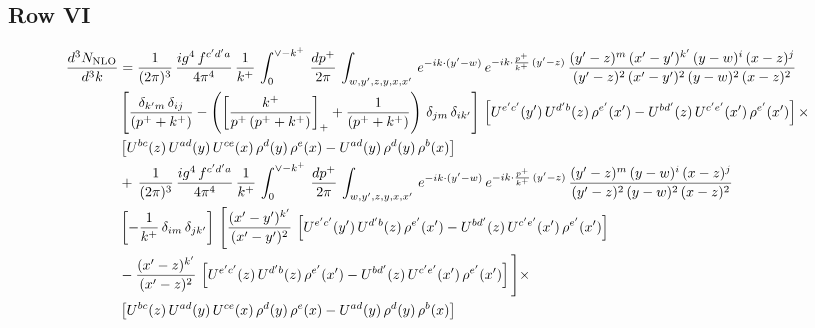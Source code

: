 \documentclass[9pt]{article}
\numberwithin{equation}{section}
\begin{document}
\subsection{Row VI}
\begin{align}
    \frac{d^{3}N_{\rm NLO}}{d^{3}k} & =  \frac{1}{(2\pi)^{3}}\, \frac{ig^{4}\,f^{c'd'a}}{4\pi^{4}}\, \frac{1}{k^{+}}\,\int_{0}^{\vee-k^{+}}\, \frac{dp^{+}}{2\pi}\, \int_{w,y',z,y,x,x'}\, e^{-ik\cdot (y'-w)}\, e^{-ik\cdot \frac{p^{+}}{k^{+}}\,(y'-z)}\,\frac{(y'-z)^{m}\,(x'-y')^{k'}\,(y-w)^{i}\,(x-z)^{j}}{(y'-z)^{2}\,(x'-y')^{2}\,(y-w)^{2}\,(x-z)^{2}}\notag \\ & \left[\frac{\delta_{k'm}\,\delta_{ij}}{(p^{+}+k^{+})}-\left(\left[\frac{k^{+}}{p^{+}\,(p^{+}+k^{+})}\right]_{+}+\frac{1}{(p^{+}+k^{+})}\right)\,\delta_{jm}\,\delta_{ik'}\right]\, \left[U^{e'c'}(y')\,U^{d'b}(z)\,\rho^{e'}(x')-U^{bd'}(z)\,U^{c'e'}(x')\,\rho^{e'}(x')\right]\times\notag \\ &  \left[U^{bc}(z)\,U^{ad}(y)\,U^{ce}(x)\,\rho^{d}(y)\,\rho^{e}(x)-U^{ad}(y)\,\rho^{d}(y)\,\rho^{b}(x)\right] \notag \\ &  +\,\frac{1}{(2\pi)^{3}}\, \frac{ig^{4}\,f^{c'd'a}}{4\pi^{4}}\, \frac{1}{k^{+}}\,\int_{0}^{\vee-k^{+}}\, \frac{dp^{+}}{2\pi}\, \int_{w,y',z,y,x,x'}\, e^{-ik\cdot (y'-w)}\, e^{-ik\cdot \frac{p^{+}}{k^{+}}\,(y'-z)}\,\frac{(y'-z)^{m}\,(y-w)^{i}\,(x-z)^{j}}{(y'-z)^{2}\,(y-w)^{2}\,(x-z)^{2}}\notag \\ &  \left[-\frac{1}{k^{+}}\, \delta_{im}\, \delta_{jk'}\right]\, \Bigg[\frac{(x'-y')^{k'}}{(x'-y')^{2}}\,\left[U^{e'c'}(y')\,U^{d'b}(z)\,\rho^{e'}(x')-U^{bd'}(z)\,U^{c'e'}(x')\,\rho^{e'}(x')\right]\notag \\ & -\frac{(x'-z)^{k'}}{(x'-z)^{2}}\,\left[U^{e'c'}(z)\,U^{d'b}(z)\,\rho^{e'}(x')-U^{bd'}(z)\,U^{c'e'}(x')\,\rho^{e'}(x')\right]\Bigg]\times\notag \\ &    \left[U^{bc}(z)\,U^{ad}(y)\,U^{ce}(x)\,\rho^{d}(y)\,\rho^{e}(x)-U^{ad}(y)\,\rho^{d}(y)\,\rho^{b}(x)\right]
\end{align}
\end{document}
